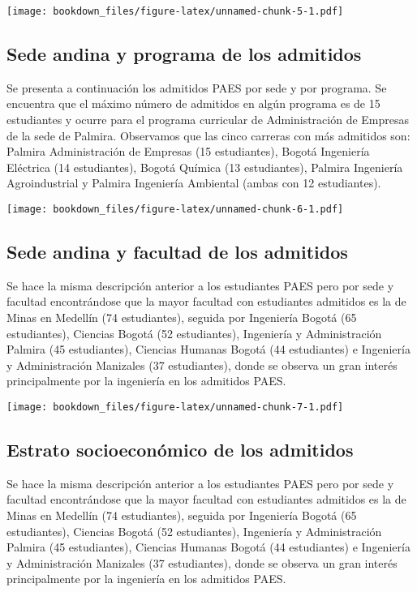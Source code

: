 \documentclass[]{article}
\theoremstyle{definition}
\theoremstyle{definition}
\theoremstyle{definition}
\theoremstyle{remark}
\begin{document}
\texttt{[image: bookdown\_files/figure-latex/unnamed-chunk-5-1.pdf]}

\subsection{Sede andina y programa de los
admitidos}\label{sede-andina-y-programa-de-los-admitidos}

Se presenta a continuación los admitidos PAES por sede y por programa.
Se encuentra que el máximo número de admitidos en algún programa es de
15 estudiantes y ocurre para el programa curricular de Administración de
Empresas de la sede de Palmira. Observamos que las cinco carreras con
más admitidos son: Palmira Administración de Empresas (15 estudiantes),
Bogotá Ingeniería Eléctrica (14 estudiantes), Bogotá Química (13
estudiantes), Palmira Ingeniería Agroindustrial y Palmira Ingeniería
Ambiental (ambas con 12 estudiantes).

\texttt{[image: bookdown\_files/figure-latex/unnamed-chunk-6-1.pdf]}

\subsection{Sede andina y facultad de los
admitidos}\label{sede-andina-y-facultad-de-los-admitidos}

Se hace la misma descripción anterior a los estudiantes PAES pero por
sede y facultad encontrándose que la mayor facultad con estudiantes
admitidos es la de Minas en Medellín (74 estudiantes), seguida por
Ingeniería Bogotá (65 estudiantes), Ciencias Bogotá (52 estudiantes),
Ingeniería y Administración Palmira (45 estudiantes), Ciencias Humanas
Bogotá (44 estudiantes) e Ingeniería y Administración Manizales (37
estudiantes), donde se observa un gran interés principalmente por la
ingeniería en los admitidos PAES.

\texttt{[image: bookdown\_files/figure-latex/unnamed-chunk-7-1.pdf]}

\subsection{Estrato socioeconómico de los
admitidos}\label{estrato-socioeconomico-de-los-admitidos}

Se hace la misma descripción anterior a los estudiantes PAES pero por
sede y facultad encontrándose que la mayor facultad con estudiantes
admitidos es la de Minas en Medellín (74 estudiantes), seguida por
Ingeniería Bogotá (65 estudiantes), Ciencias Bogotá (52 estudiantes),
Ingeniería y Administración Palmira (45 estudiantes), Ciencias Humanas
Bogotá (44 estudiantes) e Ingeniería y Administración Manizales (37
estudiantes), donde se observa un gran interés principalmente por la
ingeniería en los admitidos PAES.
\end{document}
